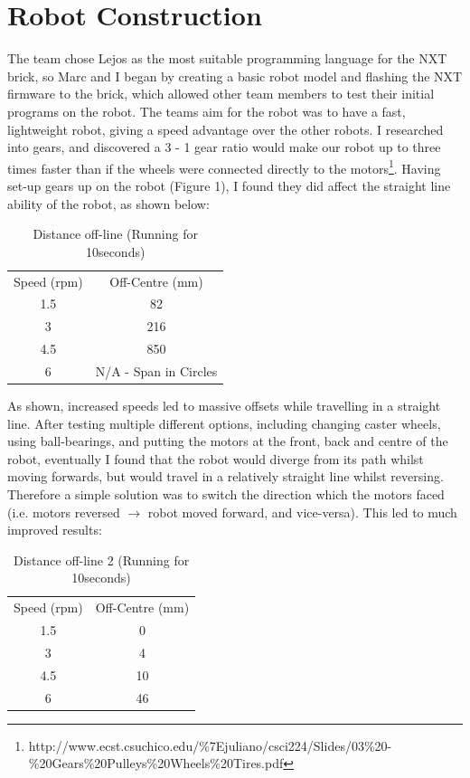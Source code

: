 \documentclass[12pt]{IEEEtran}
\begin{document}
\section{Robot Construction}
The team chose Lejos as the most suitable programming language for the NXT brick, so Marc and I began by creating a basic robot model and flashing the NXT firmware to the brick, which allowed other team members to test their initial programs on the robot. %
The teams aim for the robot was to have a fast, lightweight robot, giving a speed advantage over the other robots. I researched into gears, and discovered a 3 - 1 gear ratio would make our robot up to three times faster than if the wheels were connected directly to the motors\footnote{http://www.ecst.csuchico.edu/\%7Ejuliano/csci224/Slides/03\%20-\%20Gears\%20Pulleys\%20Wheels\%20Tires.pdf}. Having set-up gears up on the robot (Figure 1), I found they did affect the straight line ability of the robot, as shown below:
\begin{table}[ht]
\caption{Distance off-line (Running for 10seconds)}
\centering
\begin{tabular}{c c}
\hline\hline
Speed (rpm) & Off-Centre (mm) \\
1.5 & 82 \\
3 & 216 \\
4.5 & 850 \\
6 & N/A - Span in Circles \\
\hline\hline
\end{tabular}
\label{table:offline}
\end{table}

As shown, increased speeds led to massive offsets while travelling in a straight line. After testing multiple different options, including changing caster wheels, using ball-bearings, and putting the motors at the front, back and centre of the robot, eventually I found that the robot would diverge from its path whilst moving forwards, but would travel in a relatively straight line whilst reversing. Therefore a simple solution was to switch the direction which the motors faced (i.e. motors reversed $\rightarrow$ robot moved forward, and vice-versa). This led to much improved results:

\begin{table}[ht]
\caption{Distance off-line 2 (Running for 10seconds)}
\centering
\begin{tabular}{c c}
\hline\hline
Speed (rpm) & Off-Centre (mm) \\
1.5 & 0 \\
3 & 4 \\
4.5 &  10\\
6 & 46\\
\hline\hline
\end{tabular}
\label{table:online}
\end{table}
\end{document}
